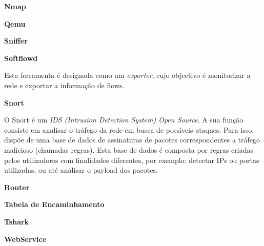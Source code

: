 \begin{description}
    \item \textbf{Nmap}
\end{description}

\begin{description}
    \item \textbf{Qemu}
\end{description}

\begin{description}
    \item \textbf{Sniffer}
\end{description}

\begin{description}
    \item \textbf{Softflowd}

Esta ferramenta é designada como um \textit{exporter}, cujo objectivo é monitorizar a rede e exportar a informação de flows.
\end{description}

\begin{description}
    \item \textbf{Snort}

O Snort é um \textit{IDS (Intrusion Detection System) Open Source}. A sua função consiste em analisar o tráfego da rede em busca de possíveis ataques. Para isso, dispõe de uma base de dados de assinaturas de pacotes correspondentes a tráfego malicioso (chamadas regras). Esta base de dados é composta por regras criadas pelos utilizadores com finalidades diferentes, por exemplo: detectar IPs ou portas utilizadas, ou até análisar o payload dos pacotes.
\end{description}

\begin{description}
    \item \textbf{Router}
\end{description}

\begin{description}
    \item \textbf{Tabela de Encaminhamento}
\end{description}

\begin{description}
    \item \textbf{Tshark}
\end{description}

\begin{description}
    \item \textbf{WebService}
\end{description}
